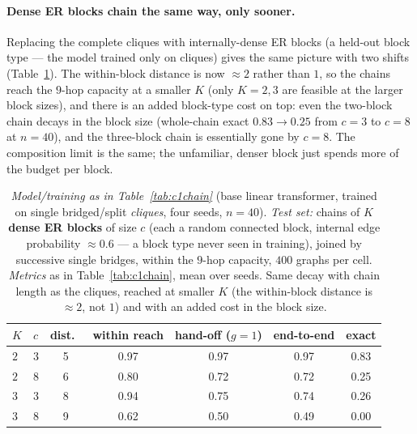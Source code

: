 \documentclass[11pt,a4paper]{article}
\begin{document}
\paragraph{Dense ER blocks chain the same way, only sooner.} Replacing the complete cliques with
internally-dense ER blocks (a held-out block type --- the model trained only on cliques) gives the same
picture with two shifts (Table~\ref{tab:c1chainer}). The within-block distance is now $\approx2$ rather
than $1$, so the chains reach the $9$-hop capacity at a smaller $K$ (only $K=2,3$ are feasible at the
larger block sizes), and there is an added block-type cost on top: even the two-block chain decays in the
block size (whole-chain exact $0.83\to0.25$ from $c=3$ to $c=8$ at $n=40$), and the three-block chain is
essentially gone by $c=8$. The composition limit is the same; the unfamiliar, denser block just spends
more of the budget per block.

\begin{table}[H]\centering\small\setlength{\tabcolsep}{4.5pt}
\begin{tabular}{llccccc}
\toprule
$K$ & $c$ & dist.\ & within reach & hand-off ($g{=}1$) & end-to-end & exact\\
\midrule
$2$ & 3 & 5 & 0.97 & 0.97 & 0.97 & 0.83\\
$2$ & 8 & 6 & 0.80 & 0.72 & 0.72 & 0.25\\
$3$ & 3 & 8 & 0.94 & 0.75 & 0.74 & 0.26\\
$3$ & 8 & 9 & 0.62 & 0.50 & 0.49 & 0.00\\
\bottomrule\end{tabular}
\caption{\emph{Model/training as in Table~\ref{tab:c1chain}} (base linear transformer, trained on single
bridged/split \emph{cliques}, four seeds, $n=40$). \emph{Test set:} chains of $K$ \textbf{dense ER
blocks} of size $c$ (each a random connected block, internal edge probability $\approx0.6$ --- a block
type never seen in training), joined by successive single bridges, within the $9$-hop capacity, $400$
graphs per cell. \emph{Metrics} as in Table~\ref{tab:c1chain}, mean over seeds. Same decay with chain
length as the cliques, reached at smaller $K$ (the within-block distance is $\approx2$, not $1$) and with
an added cost in the block size.}
\label{tab:c1chainer}
\end{table}
\end{document}
